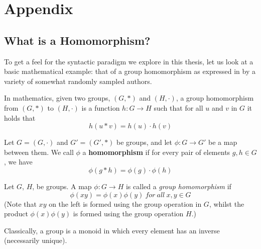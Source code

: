 \section{Appendix} \label{appendix}



\subsection{What is a Homomorphism?}

To get a feel for the syntactic paradigm we explore in this thesis, let us look at a basic mathematical
example: that of a group homomorphism as expressed in by a variety of somewhat
randomly sampled authors.  


\begin{definition}
In mathematics, given two groups, $(G, \ast)$ and $(H, \cdot)$, a group homomorphism from $(G, \ast)$ to $(H, \cdot)$ is a function $h : G \to H$ such that for all $u$ and $v$ in $G$ it holds that
  $$h(u \ast v) = h ( u ) \cdot h ( v )$$ 
\end{definition}


\begin{definition}
Let $G = (G,\cdot)$ and $G' = (G',\ast)$ be groups, and let $\phi : G \to G'$ be a map between them. We call $\phi$ a \textbf{homomorphism} if for every pair of elements $g, h \in G$, we have 
  $$\phi(g \ast h) = \phi ( g ) \cdot \phi ( h )$$ 
\end{definition}


\begin{definition}\label{def:def3}
Let $G$, $H$, be groups.  A map $\phi : G \to H$ is called a \emph{group homomorphism} if
  $$\phi(xy) = \phi ( x ) \phi ( y )\ for\ all\ x, y \in G$$ 
(Note that $xy$ on the left is formed using the group operation in $G$, whilst the product $\phi ( x ) \phi ( y )$ is formed using the group operation $H$.)
\end{definition}


\begin{definition}\label{def:def4}
Classically, a group is a monoid in which every element has an inverse (necessarily unique).
\end{definition}

